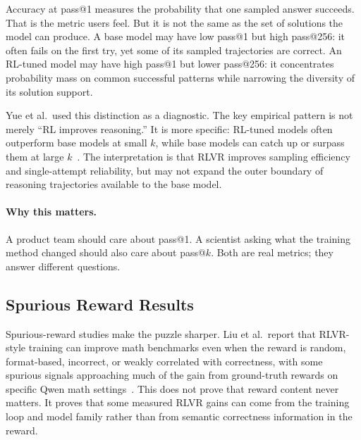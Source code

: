 Accuracy at pass@1 measures the probability that one sampled answer succeeds. That is the metric users feel. But it is not the same as the set of solutions the model can produce. A base model may have low pass@1 but high pass@256: it often fails on the first try, yet some of its sampled trajectories are correct. An RL-tuned model may have high pass@1 but lower pass@256: it concentrates probability mass on common successful patterns while narrowing the diversity of its solution support.

Yue et al.\ used this distinction as a diagnostic. The key empirical pattern is not merely ``RL improves reasoning.'' It is more specific: RL-tuned models often outperform base models at small $k$, while base models can catch up or surpass them at large $k$~\cite{yue2025rlreasoning}. The interpretation is that RLVR improves sampling efficiency and single-attempt reliability, but may not expand the outer boundary of reasoning trajectories available to the base model.

\noindent{}

\paragraph{Why this matters.} A product team should care about pass@1. A scientist asking what the training method changed should also care about pass@$k$. Both are real metrics; they answer different questions.

\subsection{Spurious Reward Results}

Spurious-reward studies make the puzzle sharper. Liu et al.\ report that RLVR-style training can improve math benchmarks even when the reward is random, format-based, incorrect, or weakly correlated with correctness, with some spurious signals approaching much of the gain from ground-truth rewards on specific Qwen math settings~\cite{liu2025spurious}. This does not prove that reward content never matters. It proves that some measured RLVR gains can come from the training loop and model family rather than from semantic correctness information in the reward.

